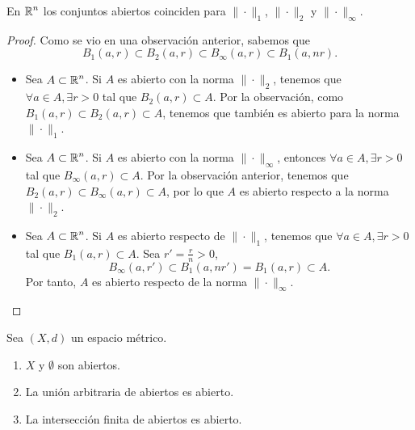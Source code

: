 \begin{prop}
En $\displaystyle \mathbb{R}^{n} $ los conjuntos abiertos coinciden para $\displaystyle \| \cdot \|_{1} $, $\displaystyle \| \cdot \|_{2} $ y $\displaystyle \| \cdot \|_{\infty} $.
\end{prop}
\begin{proof}
Como se vio en una observación anterior, sabemos que 
\[B_{1}\left(a,r\right) \subset B_{2}\left(a,r\right) \subset B_{\infty}\left(a,r\right) \subset B_{1}\left(a,nr\right) .\]
\begin{itemize}
\item Sea $\displaystyle A \subset \mathbb{R}^{n} $. Si $\displaystyle A $ es abierto con la norma $\displaystyle \| \cdot \|_{2} $, tenemos que $\displaystyle \forall a \in A, \exists r > 0 $ tal que $\displaystyle B_{2}\left(a,r\right) \subset A $. Por la observación, como $\displaystyle B_{1}\left(a,r\right) \subset B_{2}\left(a,r\right) \subset A $, tenemos que también es abierto para la norma $\displaystyle \| \cdot \|_{1} $.
\item Sea $\displaystyle A \subset \mathbb{R}^{n} $. Si $\displaystyle A $ es abierto con la norma $\displaystyle \| \cdot \|_{\infty} $, entonces $\displaystyle \forall a \in A, \exists r > 0 $ tal que $\displaystyle B_{\infty}\left(a,r\right) \subset A $. Por la observación anterior, tenemos que $\displaystyle B_{2}\left(a,r\right) \subset B_{\infty}\left(a,r\right) \subset A $, por lo que $\displaystyle A $ es abierto respecto a la norma $\displaystyle \| \cdot \|_{2} $.
\item Sea $\displaystyle A \subset \mathbb{R}^{n} $. Si $\displaystyle A $ es abierto respecto de $\displaystyle \| \cdot \|_{1} $, tenemos que $\displaystyle \forall a \in A, \exists r > 0 $ tal que $\displaystyle B_{1}\left(a,r\right) \subset A $. Sea $\displaystyle r' = \frac{r}{n} > 0 $, 
	\[B_{\infty}\left(a,r'\right)\subset B_{1}\left(a, nr'\right) = B_{1}\left(a,r\right) \subset A.\]
	Por tanto, $\displaystyle A $ es abierto respecto de la norma $\displaystyle \| \cdot \| _{\infty} $.
\end{itemize}
\end{proof}
\begin{theorem}
Sea $\displaystyle \left(X,d\right) $ un espacio métrico. 
\begin{enumerate}
\item $\displaystyle X $ y $\displaystyle \emptyset $ son abiertos.
\item La unión arbitraria de abiertos es abierto.
\item La intersección finita de abiertos es abierto.
\end{enumerate}
\end{theorem}
